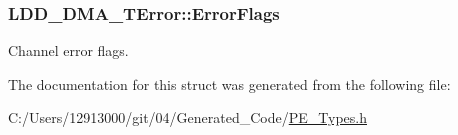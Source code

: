 \subsubsection[{Error\+Flags}]{ L\+D\+D\+\_\+\+D\+M\+A\+\_\+\+T\+Error\+::\+Error\+Flags}\label{struct_l_d_d___d_m_a___t_error_a9dd0a645e1763b4daa0058b1b29c4ad7}
Channel error flags. 

The documentation for this struct was generated from the following file\+:\begin{DoxyCompactItemize}
\item 
C\+:/\+Users/12913000/git/04/\+Generated\+\_\+\+Code/\hyperlink{_p_e___types_8h}{P\+E\+\_\+\+Types.\+h}\end{DoxyCompactItemize}
